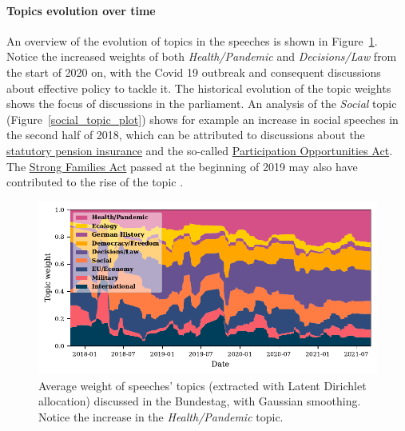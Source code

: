 \documentclass{article}
\begin{document}
\paragraph{Topics evolution over time}
An overview of the evolution of topics in the speeches is shown in Figure~\ref{stacked_area_plot}.
Notice the increased weights of both \textit{Health/Pandemic} and \textit{Decisions/Law} from the start of 2020 on, with the Covid 19 outbreak and consequent discussions about effective policy to tackle it.
The historical evolution of the topic weights shows the focus of discussions in the parliament.
An analysis of the \textit{Social} topic (Figure~\ref{social_topic_plot}) shows for example an increase in social speeches in the second half of 2018, which can be attributed to discussions about the \href{https://dserver.bundestag.de/btd/19/054/1905412.pdf}{statutory pension insurance} and the so-called \href{https://dserver.bundestag.de/btd/19/047/1904725.pdf}{Participation Opportunities Act}. 
The \href{https://dserver.bundestag.de/btd/19/075/1907504.pdf}{Strong Families Act} passed at the beginning of 2019 may also have contributed to the rise of the topic \cite{Bundestag2018}\cite{Bundestag2019}.

\begin{figure}
  \centering
  \includegraphics[width=0.9\linewidth]{images/stacked_area_plot.pdf}
  \captionsetup{width=0.9\linewidth}
  \caption{
    Average weight of speeches' topics (extracted with Latent Dirichlet allocation) discussed in the Bundestag, with Gaussian smoothing.
    Notice the increase in the \textit{Health/Pandemic} topic.
  }
  \label{stacked_area_plot}
\end{figure}
\end{document}
